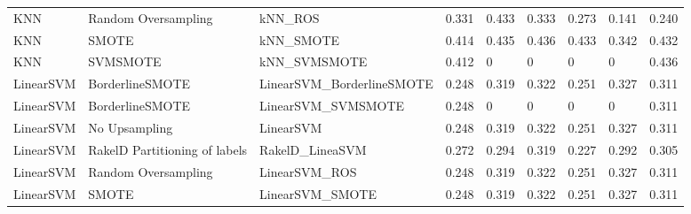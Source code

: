 \begin{tabular}{lllllllll}
                            KNN &           Random Oversampling &                                      kNN\_ROS & 0.331 &                     0.433 &                 0.333 &                  0.273 &                                   0.141 &     0.240 \\
                            KNN &                         SMOTE &                                    kNN\_SMOTE & 0.414 &                     0.435 &                 0.436 &                  0.433 &                                   0.342 &     0.432 \\
                            KNN &                      SVMSMOTE &                                 kNN\_SVMSMOTE & 0.412 &                         0 &                     0 &                      0 &                                       0 &     0.436 \\
                      LinearSVM &               BorderlineSMOTE &                    LinearSVM\_BorderlineSMOTE & 0.248 &                     0.319 &                 0.322 &                  0.251 &                                   0.327 &     0.311 \\
                      LinearSVM &               BorderlineSMOTE &                           LinearSVM\_SVMSMOTE & 0.248 &                         0 &                     0 &                      0 &                                       0 &     0.311 \\
                      LinearSVM &                 No Upsampling &                                    LinearSVM & 0.248 &                     0.319 &                 0.322 &                  0.251 &                                   0.327 &     0.311 \\
                      LinearSVM & RakelD Partitioning of labels &                              RakelD\_LineaSVM & 0.272 &                     0.294 &                 0.319 &                  0.227 &                                   0.292 &     0.305 \\
                      LinearSVM &           Random Oversampling &                                LinearSVM\_ROS & 0.248 &                     0.319 &                 0.322 &                  0.251 &                                   0.327 &     0.311 \\
                      LinearSVM &                         SMOTE &                              LinearSVM\_SMOTE & 0.248 &                     0.319 &                 0.322 &                  0.251 &                                   0.327 &     0.311 \\

\end{tabular}
